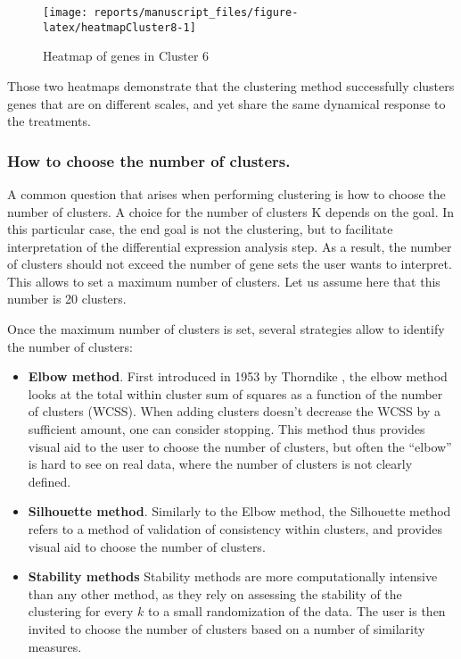 \documentclass[9pt,a4paper,]{extarticle}
\begin{document}
\begin{figure}[H]

{\centering \texttt{[image: reports/manuscript\_files/figure-latex/heatmapCluster8-1]} 

}

\caption{Heatmap of genes in Cluster 6}\label{fig:heatmapCluster8}
\end{figure}

Those two heatmaps demonstrate that the clustering method successfully
clusters genes that are on different scales, and yet share the same dynamical
response to the treatments.

\hypertarget{how-to-choose-the-number-of-clusters.}{%
\subsubsection{How to choose the number of clusters.}\label{how-to-choose-the-number-of-clusters.}}

A common question that arises when performing clustering is how to choose the
number of clusters. A choice for the number of clusters K depends on the goal.
In this particular case, the end goal is not the clustering, but to facilitate
interpretation of the differential expression analysis step. As a result, the
number of clusters should not exceed the number of gene sets the user wants to
interpret. This allows to set a maximum number of clusters. Let us assume here
that this number is 20 clusters.

Once the maximum number of clusters is set, several strategies allow to
identify the number of clusters:

\begin{itemize}
\tightlist
\item
  \textbf{Elbow method}. First introduced in 1953 by Thorndike \citep{thorndike:who},
  the elbow method looks at the total within cluster sum of squares
  as a function of the number of clusters (WCSS). When adding clusters
  doesn't decrease the WCSS by a sufficient
  amount, one can consider stopping. This method thus provides visual aid to
  the user to choose the number of clusters, but often the ``elbow'' is hard to
  see on real data, where the number of clusters is not clearly defined.
\item
  \textbf{Silhouette method}. Similarly to the Elbow method, the Silhouette method
  refers to a method of validation of consistency within clusters, and
  provides visual aid to choose the number of clusters.
\item
  \textbf{Stability methods} Stability methods are more computationally intensive
  than any other method, as they rely on assessing the stability of the
  clustering for every \(k\) to a small randomization of the data. The user is
  then invited to choose the number of clusters based on a number of similarity
  measures.
\end{itemize}
\end{document}
